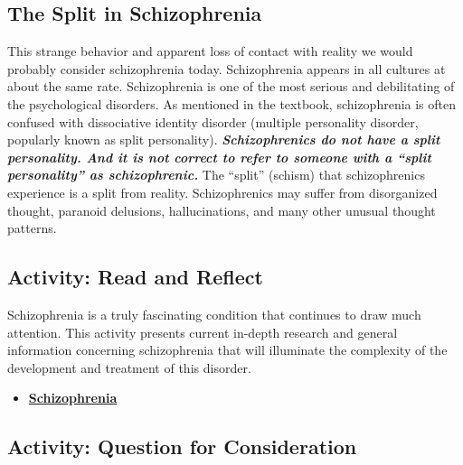 \documentclass[
]{book}
\providecommand{\tightlist}{%
  \setlength{\itemsep}{0pt}\setlength{\parskip}{0pt}}
\begin{document}
\hypertarget{the-split-in-schizophrenia}{%
\subsection*{The Split in Schizophrenia}\label{the-split-in-schizophrenia}}

This strange behavior and apparent loss of contact with reality we would probably consider schizophrenia today. Schizophrenia appears in all cultures at about the same rate. Schizophrenia is one of the most serious and debilitating of the psychological disorders. As mentioned in the textbook, schizophrenia is often confused with dissociative identity disorder (multiple personality disorder, popularly known as split personality). \textbf{\emph{Schizophrenics do not have a split personality. And it is not correct to refer to someone with a ``split personality'' as schizophrenic.}} The ``split'' (schism) that schizophrenics experience is a split from reality. Schizophrenics may suffer from disorganized thought, paranoid delusions, hallucinations, and many other unusual thought patterns.

\hypertarget{activity-read-and-reflect-18}{%
\subsection*{Activity: Read and Reflect}\label{activity-read-and-reflect-18}}

\begin{reflect}
Schizophrenia is a truly fascinating condition that continues to draw much attention. This activity presents current in-depth research and general information concerning schizophrenia that will illuminate the complexity of the development and treatment of this disorder.

\begin{itemize}
\tightlist
\item
  \href{http://schizophrenia.com/}{\textbf{Schizophrenia}}
\end{itemize}
\end{reflect}

\hypertarget{activity-question-for-consideration-6}{%
\subsection*{Activity: Question for Consideration}\label{activity-question-for-consideration-6}}
\end{document}
